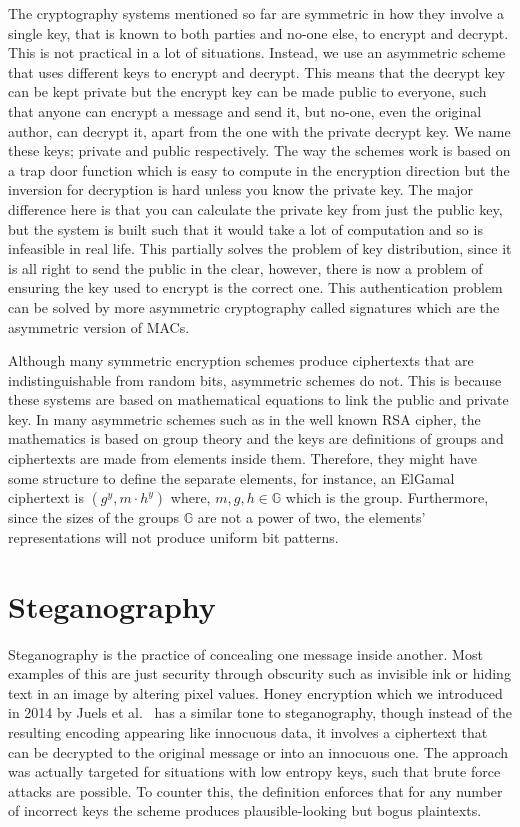 \documentclass[ %
                    author={Samuel Russell},
                supervisor={Prof. Bogdan Warinschi},
                    degree={MEng},
                     title={Innocuous Ciphertexts},
                  subtitle={The DE-CENSOR Scheme},
                      type={research},
                      year={2018} ]{dissertation}
\begin{document}
The cryptography systems mentioned so far are symmetric in how they involve a single key, that is known to both parties and no-one else, to encrypt and decrypt.
This is not practical in a lot of situations.
Instead, we use an asymmetric scheme that uses different keys to encrypt and decrypt.
This means that the decrypt key can be kept private but the encrypt key can be made public to everyone, such that anyone can encrypt a message and send it, but no-one, even the original author, can decrypt it, apart from the one with the private decrypt key.
We name these keys; private and public respectively.
The way the schemes work is based on a trap door function which is easy to compute in the encryption direction but the inversion for decryption is hard unless you know the private key.
The major difference here is that you can calculate the private key from just the public key, but the system is built such that it would take a lot of computation and so is infeasible in real life.
This partially solves the problem of key distribution, since it is all right to send the public in the clear, however, there is now a problem of ensuring the key used to encrypt is the correct one.
This authentication problem can be solved by more asymmetric cryptography called signatures which are the asymmetric version of MACs.

Although many symmetric encryption schemes produce ciphertexts that are indistinguishable from random bits, asymmetric schemes do not.
This is because these systems are based on mathematical equations to link the public and private key.
In many asymmetric schemes such as in the well known RSA cipher, the mathematics is based on group theory and the keys are definitions of groups and ciphertexts are made from elements inside them.
Therefore, they might have some structure to define the separate elements, for instance, an ElGamal ciphertext is $(g^y, m \cdot h^y )$ where, $m,g,h \in \mathbb{G}$ which is the group.
Furthermore, since the sizes of the groups $\mathbb{G}$ are not a power of two, the elements' representations will not produce uniform bit patterns.

\section{Steganography}

Steganography is the practice of concealing one message inside another.
Most examples of this are just security through obscurity such as invisible ink or hiding text in an image by altering pixel values.
Honey encryption which we introduced in 2014 by Juels et al.~\cite{honey} has a similar tone to steganography, though instead of the resulting encoding appearing like innocuous data, it involves a ciphertext that can be decrypted to the original message or into an innocuous one.
The approach was actually targeted for situations with low entropy keys, such that brute force attacks are possible. To counter this, the definition enforces that for any number of incorrect keys the scheme produces plausible-looking but bogus plaintexts.
\end{document}
